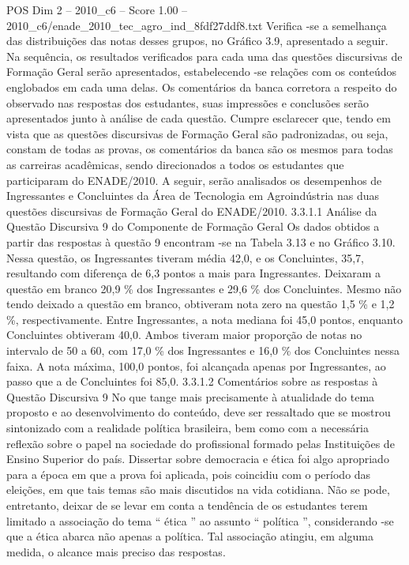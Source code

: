 \begin{textsample}{POS Dim 2 – 2010\_c6 – Score 1.00 – 2010\_c6/enade\_2010\_tec\_agro\_ind\_8fdf27ddf8.txt}
Verifica -se a semelhança das distribuições das notas desses grupos, no Gráfico 3.9, apresentado a seguir.
Na sequência, os resultados verificados para cada uma das questões discursivas de Formação Geral serão apresentados, estabelecendo -se relações com os conteúdos englobados em cada uma delas.
Os comentários da banca corretora a respeito do observado nas respostas dos estudantes, suas impressões e conclusões serão apresentados junto à análise de cada questão.
Cumpre esclarecer que, tendo em vista que as questões discursivas de Formação Geral são padronizadas, ou seja, constam de todas as provas, os comentários da banca são os mesmos para todas as carreiras acadêmicas, sendo direcionados a todos os estudantes que participaram do ENADE/2010.
A seguir, serão analisados os desempenhos de Ingressantes e Concluintes da Área de Tecnologia em Agroindústria nas duas questões discursivas de Formação Geral do ENADE/2010. 3.3.1.1 Análise da Questão Discursiva 9 do Componente de Formação Geral Os dados obtidos a partir das respostas à questão 9 encontram -se na Tabela 3.13 e no Gráfico 3.10.
Nessa questão, os Ingressantes tiveram média 42,0, e os Concluintes, 35,7, resultando com diferença de 6,3 pontos a mais para Ingressantes.
Deixaram a questão em branco 20,9 \% dos Ingressantes e 29,6 \% dos Concluintes.
Mesmo não tendo deixado a questão em branco, obtiveram nota zero na questão 1,5 \% e 1,2 \%, respectivamente.
Entre Ingressantes, a nota mediana foi 45,0 pontos, enquanto Concluintes obtiveram 40,0.
Ambos tiveram maior proporção de notas no intervalo de 50 a 60, com 17,0 \% dos Ingressantes e 16,0 \% dos Concluintes nessa faixa.
A nota máxima, 100,0 pontos, foi alcançada apenas por Ingressantes, ao passo que a de Concluintes foi 85,0. 3.3.1.2 Comentários sobre as respostas à Questão Discursiva 9 No que tange mais precisamente à atualidade do tema proposto e ao desenvolvimento do conteúdo, deve ser ressaltado que se mostrou sintonizado com a realidade política brasileira, bem como com a necessária reflexão sobre o papel na sociedade do profissional formado pelas Instituições de Ensino Superior do país.
Dissertar sobre democracia e ética foi algo apropriado para a época em que a prova foi aplicada, pois coincidiu com o período das eleições, em que tais temas são mais discutidos na vida cotidiana.
Não se pode, entretanto, deixar de se levar em conta a tendência de os estudantes terem limitado a associação do tema “ ética ” ao assunto “ política ”, considerando -se que a ética abarca não apenas a política.
Tal associação atingiu, em alguma medida, o alcance mais preciso das respostas.

\end{textsample}

